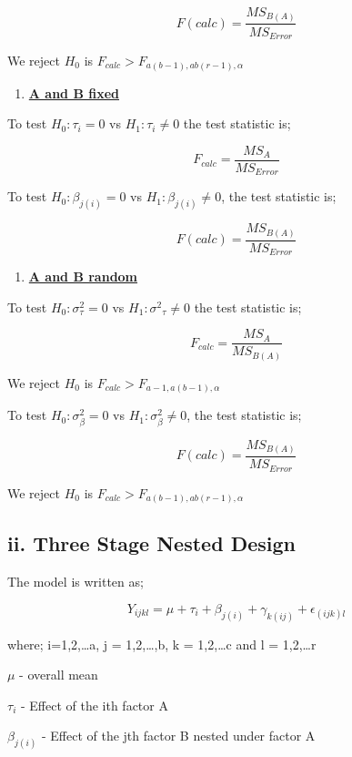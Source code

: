\documentclass[
]{article}
\providecommand{\tightlist}{%
  \setlength{\itemsep}{0pt}\setlength{\parskip}{0pt}}
\begin{document}
\[F{(calc)=\frac{MS_{B(A)}}{MS_{Error}}}\]

We reject \(H_0\) is \(F_{calc}>F_{a(b-1),ab(r-1),\alpha}\)

\begin{enumerate}
\def\labelenumi{\arabic{enumi}.}
\setcounter{enumi}{1}
\tightlist
\item
  \uline{\textbf{A and B fixed}}
\end{enumerate}

To test \(H_0:\tau_i=0\) vs \(H_1:\tau_i\ne0\) the test statistic is;

\[F_{calc}=\frac{MS_A}{MS_{Error}}\]

To test \(H_0:\beta_{j(i)}=0\) vs \(H_1:\beta_{j(i)}\neq0\), the test
statistic is;

\[F{(calc)=\frac{MS_{B(A)}}{MS_{Error}}}\]

\begin{enumerate}
\def\labelenumi{\arabic{enumi}.}
\setcounter{enumi}{2}
\tightlist
\item
  \uline{\textbf{A and B random}}
\end{enumerate}

To test \(H_0:\sigma^2_{\tau}=0\) vs \(H_1:\sigma^2{_\tau}\ne0\) the
test statistic is;

\[F_{calc}=\frac{MS_A}{MS_{B(A)}}\]

We reject \(H_0\) is \(F_{calc}>F_{a-1,a(b-1),\alpha}\)

To test \(H_0:\sigma^2_\beta=0\) vs \(H_1:\sigma^2_\beta\neq0\), the
test statistic is;

\[F{(calc)=\frac{MS_{B(A)}}{MS_{Error}}}\]

We reject \(H_0\) is \(F_{calc}>F_{a(b-1),ab(r-1),\alpha}\)

\hypertarget{ii.-three-stage-nested-design}{%
\subsection{ii. Three Stage Nested
Design}\label{ii.-three-stage-nested-design}}

The model is written as;

\[Y_{ijkl}=\mu+\tau_i+\beta_{j(i)}+\gamma_{k(ij)}+\epsilon_{(ijk)l}\]

where; i=1,2,\ldots a, j = 1,2,\ldots,b, k = 1,2,\ldots c and l =
1,2,\ldots r

\(\mu\) - overall mean

\(\tau_i\) - Effect of the ith factor A

\(\beta_{j(i)}\) - Effect of the jth factor B nested under factor A
\end{document}
